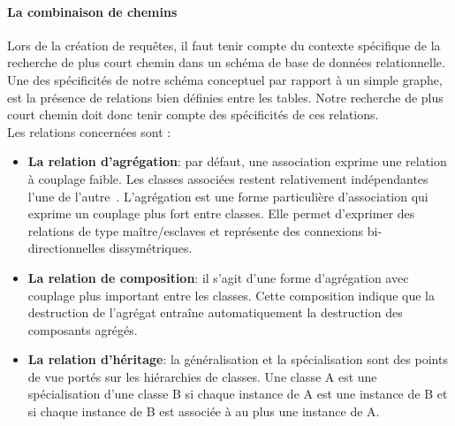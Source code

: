 \paragraph*{La combinaison de chemins}
Lors de la création de requêtes, il faut tenir compte du contexte spécifique de la recherche de plus court chemin dans un schéma de base de données relationnelle. Une des spécificités de notre schéma conceptuel par rapport à un simple graphe, est la présence de relations bien définies entre les tables. Notre recherche de plus court chemin doit donc tenir compte des spécificités de ces relations.\\

Les relations concernées sont :\\
\begin{itemize}
\item \textbf{La relation d'agrégation}: par défaut, une association exprime une relation à couplage faible. Les classes associées restent relativement indépendantes l'une de l'autre~\cite{modelisation_2002}. L'agrégation est une forme particulière d'association qui exprime un couplage plus fort entre classes. Elle permet d'exprimer des relations de type maître/esclaves et représente des connexions bi-directionnelles dissymétriques. \\
\item \textbf{La relation de composition}: il s'agit d'une forme d'agrégation avec couplage plus important entre les classes. Cette composition indique que la destruction de l'agrégat entraîne automatiquement la destruction des composants agrégés.\\
\item \textbf{La relation d'héritage}: la généralisation et la spécialisation sont des points de vue portés sur les hiérarchies de classes. Une classe A est une spécialisation d'une classe B si chaque instance de A est une instance de B et si chaque instance de B est associée à au plus une instance de A.\\

\end{itemize}

